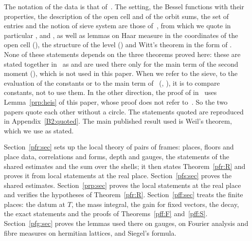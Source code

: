 \documentclass[10pt]{amsart}
\theoremstyle{definition}
\theoremstyle{remark}
\begin{document}
The notation of the data is that of~\cite{P46}. The setting, the Bessel functions with their
properties, the description of the open cell and of the orbit sums, the set of entries and the
notion of sieve system are those of~\cite{P51}, from which we quote in particular
{\cite[Theorems~3.16 and~3.22]{P51}}, {\cite[Propositions~3.18, 3.41 and~3.42]{P51}} and {\cite[Definition~3.44]{P51}}, as well as lemmas on Haar measure in the
coordinates of the open cell ({\cite[Lemmas~3.6, 8.80 and~8.81]{P51}}), the structure of the level ({\cite[Lemma~2.1]{P51}}) and Witt's theorem in the form of {\cite[Lemma~7.12]{P51}}. None of
these statements depends on the three theorems proved here: these are stated together in~\cite{P51} as {\cite[Theorem~3.51]{P51}} and are used there only for
the main term of the second moment ({\cite[Theorem~3.53]{P51}}), which is not used in this paper. When
we refer to the sieve, to the evaluation of the constants or to the main term
of~\cite{P51} ({\cite[Theorems~3.50 and~3.53]{P51}}, {\cite[Lemma~3.52]{P51}}), it is to compare constants, not to use them. In the other direction, the proof of {\cite[Lemma~3.6]{P51}} in~\cite{P51} uses Lemma~\ref{prp:heis} of this paper, whose proof does not refer to~\cite{P51}. So the two papers quote each other
without a circle. The statements quoted are reproduced in Appendix~\ref{B2:quoted}. The main
published result used is Weil's theorem, which we use as stated.

Section~\ref{pfr:sec} sets up the local theory of pairs of frames: places, floors and place data,
correlations and forms, depth and gauges, the statements of the shared estimates and the sum over
the shells; it then states Theorem~\ref{pfr:R} and proves it from local statements at the real
place. Section~\ref{pfs:sec} proves the shared estimates. Section~\ref{prp:sec} proves the local
statements at the real place and verifies the hypotheses of Theorem~\ref{pfr:R}.
Section~\ref{pff:sec} treats the finite places: the datum at $T$, the mass integral, the gain for
fixed vectors, the decay, the exact statements and the proofs of Theorems~\ref{pff:F}
and~\ref{pff:S}. Section~\ref{pfg:sec} proves the lemmas used there on gauges, on Fourier analysis
and fibre measures on hermitian lattices, and Siegel's formula.
\end{document}
